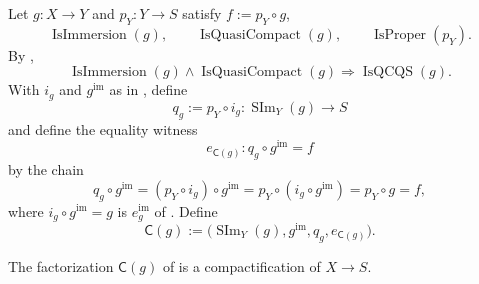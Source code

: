 \begin{definition}
  \label{def:nagata-immersion-compactification}

  Let $g\colon X\to Y$ and $p_Y\colon Y\to S$ satisfy
  $f:=p_Y\circ g$,
  \[
    \operatorname{IsImmersion}(g),\qquad
    \operatorname{IsQuasiCompact}(g),\qquad
    \operatorname{IsProper}(p_Y).
  \]
  By ,
  \[
    \operatorname{IsImmersion}(g)\wedge
    \operatorname{IsQuasiCompact}(g)
      \Longrightarrow\operatorname{IsQCQS}(g).                  \tag{IC-1}
  \]
  With $i_g$ and $g^{\mathrm{im}}$ as in
  ,
  define
  \[
    q_g:=p_Y\circ i_g\colon\operatorname{SIm}_Y(g)\to S
  \]
  and define the equality witness
  \[
    e_{\mathsf C(g)}\colon q_g\circ g^{\mathrm{im}}=f
  \]
  by the chain
  \[
    q_g\circ g^{\mathrm{im}}
      =(p_Y\circ i_g)\circ g^{\mathrm{im}}
      =p_Y\circ(i_g\circ g^{\mathrm{im}})
      =p_Y\circ g=f,
  \]
  where $i_g\circ g^{\mathrm{im}}=g$ is
  $e_g^{\mathrm{im}}$ of .  Define
  \[
    \mathsf C(g):=
      \bigl(\operatorname{SIm}_Y(g),g^{\mathrm{im}},q_g,
        e_{\mathsf C(g)}\bigr).
  \]
\end{definition}

\begin{lemma}
  \label{lemma:nagata-immersion-into-proper}

  The factorization $\mathsf C(g)$ of
   is a compactification of
  $X\to S$.
\end{lemma}

